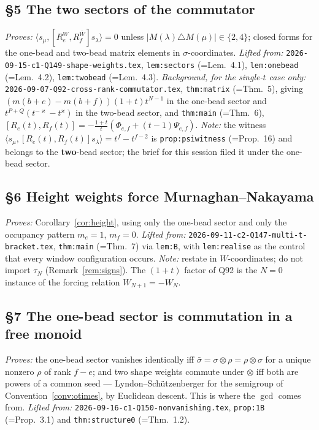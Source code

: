 \documentclass[11pt]{article}
\theoremstyle{definition}
\theoremstyle{remark}
\begin{document}
\subsection*{\S5 The two sectors of the commutator}
\emph{Proves:} $\langle s_\mu,[R_e^{W},R_f^{\bar W}]s_\lambda\rangle=0$ unless
$|M(\lambda)\triangle M(\mu)|\in\{2,4\}$; closed forms for the one-bead and two-bead matrix
elements in $\sigma$-coordinates.
\emph{Lifted from:} \texttt{2026-09-15-c1-Q149-shape-weights.tex}, \texttt{lem:sectors}
(=Lem.~4.1), \texttt{lem:onebead} (=Lem.~4.2), \texttt{lem:twobead} (=Lem.~4.3).
\emph{Background, for the single-$t$ case only:}
\texttt{2026-09-07-Q92-cross-rank-commutator.tex}, \texttt{thm:matrix} (=Thm.~5), giving
$(m(b+e)-m(b+f))(1+t)t^{N-1}$ in the one-bead sector and $t^{P+Q}(t^{-\varkappa}-t^{\varkappa})$
in the two-bead sector, and \texttt{thm:main} (=Thm.~6),
$[R_e(t),R_f(t)]=-\frac{1+t}{t}(\Phi_{e,f}+(t-1)\Psi_{e,f})$.
\emph{Note:} the witness $\langle s_\mu,[R_e(t),R_f(t)]s_\lambda\rangle=t^{f}-t^{f-2}$ is
\texttt{prop:psiwitness} (=Prop.~16) and belongs to the \textbf{two}-bead sector; the brief
for this session filed it under the one-bead sector.

\subsection*{\S6 Height weights force Murnaghan--Nakayama}\label{sec:height}
\emph{Proves:} Corollary~\ref{cor:height}, using only the one-bead sector and only the
occupancy pattern $m_e=1$, $m_f=0$.
\emph{Lifted from:} \texttt{2026-09-11-c2-Q147-multi-t-bracket.tex}, \texttt{thm:main}
(=Thm.~7) via \texttt{lem:B}, with \texttt{lem:realise} as the control that every window
configuration occurs.
\emph{Note:} restate in $W$-coordinates; do not import $\tau_N$
(Remark~\ref{rem:signs}).  The $(1+t)$ factor of Q92 is the $N=0$ instance of the forcing
relation $W_{N+1}=-W_N$.

\subsection*{\S7 The one-bead sector is commutation in a free monoid}
\emph{Proves:} the one-bead sector vanishes identically iff $\bar\sigma=\sigma\otimes\rho
=\rho\otimes\sigma$ for a unique nonzero $\rho$ of rank $f-e$; and two shape weights commute
under $\otimes$ iff both are powers of a common seed --- Lyndon--Sch\"utzenberger for the
semigroup of Convention~\ref{conv:otimes}, by Euclidean descent.  This is where the $\gcd$
comes from.
\emph{Lifted from:} \texttt{2026-09-16-c1-Q150-nonvanishing.tex}, \texttt{prop:1B}
(=Prop.~3.1) and \texttt{thm:structure0} (=Thm.~1.2).
\end{document}
